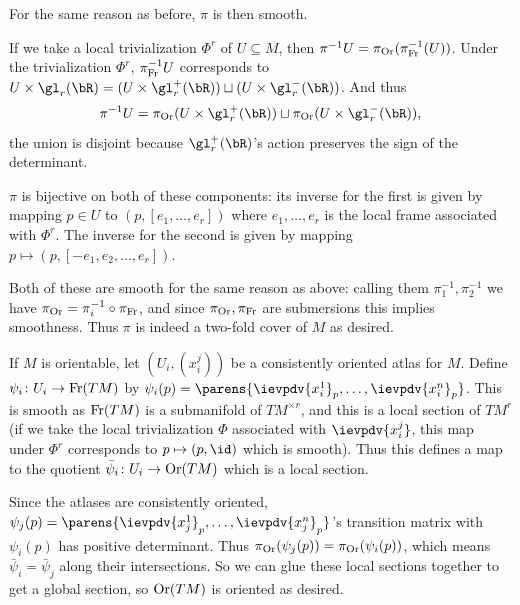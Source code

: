     \centerline{}

    For the same reason as before, $\pi$ is then smooth.

    If we take a local trivialization $\Phi^r$ of $U\subseteq M$, then $\pi^{-1}U=\pi_{\rm Or}(\pi_{\rm Fr}^{-1}(U))$.
    Under the trivialization $\Phi^r$, $\pi_{\rm Fr}^{-1}U$ corresponds to $U\times\gl_r(\bR)=(U\times\gl_r^+(\bR))\sqcup(U\times\gl_r^-(\bR))$.
    And thus
    $$ \pi^{-1}U = \pi_\Or(U\times\gl_r^+(\bR)) \sqcup \pi_\Or(U\times\gl_r^-(\bR)) , $$
    the union is disjoint because $\gl_r^+(\bR)$'s action preserves the sign of the determinant.

    $\pi$ is bijective on both of these components: its inverse for the first is given by mapping $p\in U$ to $(p,[e_1,\dots,e_r])$ where $e_1,\dots,e_r$
    is the local frame associated with $\Phi^r$.
    The inverse for the second is given by mapping $p\mapsto(p,[-e_1,e_2,\dots,e_r])$.

    Both of these are smooth for the same reason as above: calling them $\pi_1^{-1},\pi_2^{-1}$ we have $\pi_{\rm Or}=\pi_i^{-1}\circ\pi_{\rm Fr}$, and since $\pi_{\rm Or},\pi_{\rm Fr}$
    are submersions this implies smoothness.
    Thus $\pi$ is indeed a two-fold cover of $M$ as desired.

    \item If $M$ is orientable, let $(U_i,(x^j_i))$ be a consistently oriented atlas for $M$.
    Define $\psi_i\colon U_i\to{\rm Fr}(TM)$ by $\psi_i(p)=\parens{\ievpdv{x^1_i}_p,\dots,\ievpdv{x^n_i}_p}$.
    This is smooth as ${\rm Fr}(TM)$ is a submanifold of $TM^{\times r}$, and this is a local section of $TM^r$ (if we take the local trivialization $\Phi$ associated with $\ievpdv{x^j_i}$,
    this map under $\Phi^r$ corresponds to $p\mapsto(p,\id)$ which is smooth).
    Thus this defines a map to the quotient $\bar\psi_i\colon U_i\to{\rm Or}(TM)$ which is a local section.

    Since the atlases are consistently oriented, $\psi_j(p)=\parens{\ievpdv{x^1_j}_p,\dots,\ievpdv{x^n_j}_p}$'s transition matrix with $\psi_i(p)$ has positive determinant.
    Thus $\pi_{\rm Or}(\psi_j(p))=\pi_{\rm Or}(\psi_i(p))$, which means $\bar\psi_i=\bar\psi_j$ along their intersections.
    So we can glue these local sections together to get a global section, so ${\rm Or}(TM)$ is oriented as desired.


